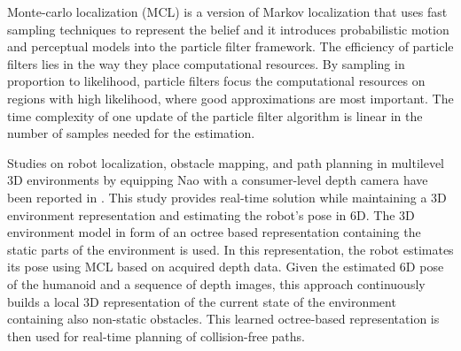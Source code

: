 Monte-carlo localization (MCL) \cite{fox1999monte} is a version of Markov localization that uses fast sampling techniques to represent the belief and it introduces probabilistic motion and perceptual models into the particle filter framework. The efficiency of particle filters lies in the way they place computational resources. By sampling in proportion to likelihood, particle filters focus the computational resources on regions with high likelihood, where good approximations are most important. The time complexity of one update of the particle filter algorithm is linear in the number of samples needed for the estimation. 
	
Studies on robot localization, obstacle mapping, and path planning in multilevel 3D environments by equipping Nao with a consumer-level depth camera have been reported in \cite{maier2012real}. This study provides real-time solution while maintaining a 3D environment representation and estimating the robot’s pose in 6D. The 3D environment model in form of an octree based representation containing the static parts of the environment is used. In this representation, the robot estimates its pose using MCL based on acquired depth data. Given the estimated 6D pose of the humanoid and a sequence of depth images, this approach continuously builds a local 3D representation of the current state of the environment containing also non-static obstacles. This learned octree-based representation is then used for real-time planning of collision-free paths. 
	
